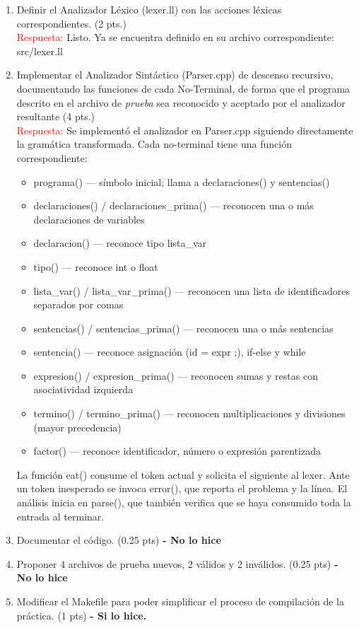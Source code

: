 \documentclass[11pt]{report}
\begin{document}
\begin{enumerate}
    \texttt{termino' -> * factor termino' | } $\backslash$ \texttt{factor termino' | } $\epsilon$ \\
    \texttt{factor -> identificador | numero | (expresion)} \\
    \texttt{\}}
\item Definir el Analizador Léxico (lexer.ll) con las acciones léxicas correspondientes.
  (2 pts.) \\
    \textcolor{red}{Respuesta:} Listo. Ya se encuentra definido en su archivo correspondiente: src/lexer.ll
\item Implementar el Analizador Sintáctico (Parser.cpp) de descenso recursivo, documentando
  las funciones de cada No-Terminal, de forma que el programa descrito en el archivo de
    \textit{prueba} sea reconocido y aceptado por el analizador resultante (4 pts.) \\
    \textcolor{red}{Respuesta:} Se implementó el analizador en Parser.cpp siguiendo directamente
    la gramática transformada. Cada no-terminal tiene una función correspondiente: \\
    \begin{itemize}
      \item programa() — símbolo inicial; llama a declaraciones() y sentencias()
      \item declaraciones() / declaraciones\_prima() — reconocen una o más declaraciones de variables
      \item declaracion() — reconoce tipo lista\_var
      \item tipo() — reconoce int o float
      \item lista\_var() / lista\_var\_prima() — reconocen una lista de identificadores separados por comas
      \item sentencias() / sentencias\_prima() — reconocen una o más sentencias
      \item sentencia() — reconoce asignación (id = expr ;), if-else y while
      \item expresion() / expresion\_prima() — reconocen sumas y restas con asociatividad izquierda
      \item termino() / termino\_prima() — reconocen multiplicaciones y divisiones (mayor precedencia)
      \item factor() — reconoce identificador, número o expresión parentizada
    \end{itemize}
    La función eat() consume el token actual y solicita el siguiente al lexer. Ante un token
    inesperado se invoca error(), que reporta el problema y la línea. El análisis inicia en
    parse(), que también verifica que se haya consumido toda la entrada al terminar.
\item Documentar el código. (0.25 pts) \textbf{- No lo hice}
\item Proponer 4 archivos de prueba nuevos, 2 válidos y 2 inválidos. (0.25 pts) \textbf{- No lo hice}
\item Modificar el Makefile para poder simplificar el proceso de compilación de la práctica.
  (1 pts) \textbf{- Si lo hice.}
\end{enumerate}
\end{document}
